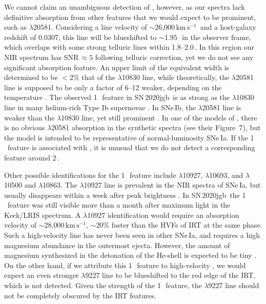 \documentclass[twocolumn]{aastex631}
\newcommand{\sn}{SN\,2020jgb}
\newcommand{\kms}{$\mathrm{km}\,\mathrm{s}^{-1}$}
\begin{document}
We cannot claim an unambiguous detection of , however, as our spectra lack definitive absorption from other  features that we would expect to be prominent, such as  $\lambda$20581. Considering a line velocity of $\sim$26,000\,\kms\ and a host-galaxy redshift of 0.0307, this line will be blueshifted to $\sim$1.95\,\micron\ in the observer frame, which overlaps with some strong telluric lines within 1.8--2.0\,\micron. In this region our NIR spectrum has SNR$\,\approx 5$ following telluric correction, yet we do not see any significant absorption feature. An upper limit of the equivalent width is determined to be $<$2\% that of the  $\lambda$10830 line, while theoretically, the $\lambda$20581 line is supposed to be only a factor of 6--12 weaker, depending on the temperature \citep{Marion2009_NIR}. The observed 1\,\micron\ feature in \sn\ is as strong as the  $\lambda$10830 line in many helium-rich Type Ib supernovae \citep[SNe\,Ib; see][for a review of SN spectral classification]{Filippenko97, Gal-Yam_2017}. In SNe\,Ib, the  $\lambda$20581 line is weaker than the  $\lambda$10830 line, yet still prominent \citep{CSP_Ibc_2022}. In one of the models of \citet{Boyle2017_Helium}, there is no obvious  $\lambda$20581 absorption in the synthetic spectra (see their Figure~7), but the model is intended to be representative of normal-luminosity SNe\,Ia. If the 1\,\micron\ feature is associated with , it is unusual that we do not detect a corresponding feature around 2\,\micron.

Other possible identifications for the 1\,\micron\ feature include  $\lambda$10927,  $\lambda$10693, and  $\lambda$10500 and $\lambda$10863. The  $\lambda$10927 line is prevalent in the NIR spectra of SNe\,Ia, but usually disappears within a week after peak brightness \citep{Marion2009_NIR}. In \sn\ the 1\,\micron\ feature was still visible more than a month after maximum light in the Keck/LRIS spectrum. A  $\lambda$10927 identification would require an absorption velocity of $\sim$28,000\,\kms, $\sim$20\% faster than the HVFs of  IRT at the same phase. Such a high-velocity  line has never been seen in other SNe\,Ia, and requires a high magnesium abundance in the outermost ejecta. However, the amount of magnesium synthesized in the detonation of the He-shell is expected to be tiny \citep{Fink_DD_2010,Kromer_DD_2010,polin_observational_2019,polin_nebular_2021}. On the other hand, if we attribute this 1\,\micron\ feature to high-velocity , we would expect an even stronger  $\lambda$9227 line to be blueshifted to the red edge of the  IRT, which is not detected. Given the strength of the 1\,\micron\ feature, the  $\lambda$9227 line should not be completely obscured by the  IRT features.
\end{document}
